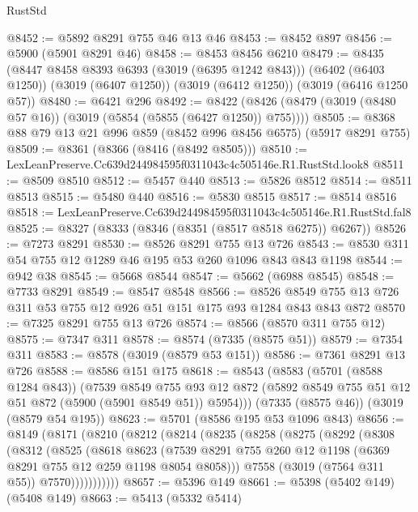 \begin{lexlean}{RustStd}
\begin{coremodule}
@8452 := @5892 @8291 @755 @46 @13 @46
@8453 := @8452 @897
@8456 := @5900 (@5901 @8291 @46)
@8458 := @8453 @8456 @6210
@8479 := @8435
    (@8447 @8458 @8393 @6393 (@3019 (@6395 @1242 @843)))
    (@6402 (@6403 @1250))
    (@3019 (@6407 @1250))
    (@3019 (@6412 @1250))
    (@3019 (@6416 @1250 @57))
@8480 := @6421 @296
@8492 := @8422 (@8426 (@8479 (@3019 (@8480 @57 @16)) (@3019 (@5854 (@5855 (@6427 @1250)) @755))))
@8505 := @8368 @88 @79 @13 @21 @996 @859 (@8452 @996 @8456 @6575) (@5917 @8291 @755)
@8509 := @8361 (@8366 (@8416 (@8492 @8505)))
@8510 := LexLeanPreserve.Cc639d244984595f0311043c4c505146e.R1.RustStd.look8
@8511 := @8509 @8510
@8512 := @5457 @440
@8513 := @5826 @8512
@8514 := @8511 @8513
@8515 := @5480 @440
@8516 := @5830 @8515
@8517 := @8514 @8516
@8518 := LexLeanPreserve.Cc639d244984595f0311043c4c505146e.R1.RustStd.fal8
@8525 := @8327 (@8333 (@8346 (@8351 (@8517 @8518 @6275)) @6267))
@8526 := @7273 @8291
@8530 := @8526 @8291 @755 @13 @726
@8543 := @8530 @311 @54 @755 @12 @1289 @46 @195 @53 @260 @1096 @843 @843 @1198
@8544 := @942 @38
@8545 := @5668 @8544
@8547 := @5662 (@6988 @8545)
@8548 := @7733 @8291
@8549 := @8547 @8548
@8566 := @8526 @8549 @755 @13 @726 @311 @53 @755 @12 @926 @51 @151 @175 @93 @1284 @843 @843 @872
@8570 := @7325 @8291 @755 @13 @726
@8574 := @8566 (@8570 @311 @755 @12)
@8575 := @7347 @311
@8578 := @8574 (@7335 (@8575 @51))
@8579 := @7354 @311
@8583 := @8578 (@3019 (@8579 @53 @151))
@8586 := @7361 @8291 @13 @726
@8588 := @8586 @151 @175
@8618 := @8543
    (@8583
      (@5701 (@8588 @1284 @843))
      (@7539
        @8549
        @755
        @93
        @12
        @872
        (@5892 @8549 @755 @51 @12 @51 @872 (@5900 (@5901 @8549 @51)) @5954)))
    (@7335 (@8575 @46))
    (@3019 (@8579 @54 @195))
@8623 := @5701 (@8586 @195 @53 @1096 @843)
@8656 := @8149
    (@8171
      (@8210
        (@8212
          (@8214
            (@8235
              (@8258
                (@8275
                  (@8292
                    (@8308
                      (@8312
                        (@8525
                          (@8618
                            @8623
                            (@7539
                              @8291
                              @755
                              @260
                              @12
                              @1198
                              (@6369 @8291 @755 @12 @259 @1198 @8054 @8058)))
                          @7558
                          (@3019 (@7564 @311 @55))
                          @7570)))))))))))
@8657 := @5396 @149
@8661 := @5398 (@5402 @149) (@5408 @149)
@8663 := @5413 (@5332 @5414)

\end{coremodule}
\end{lexlean}
